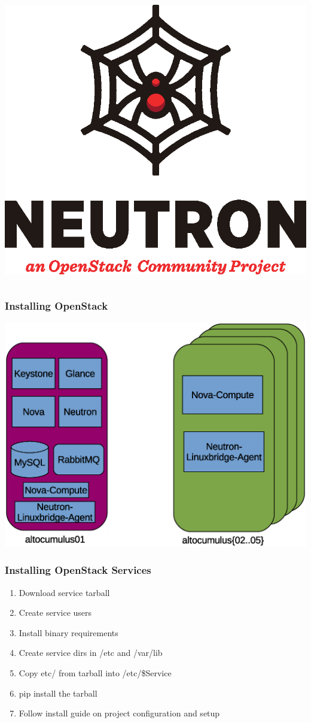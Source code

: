 \documentclass[aspectratio=169,11pt,hyperref={colorlinks=true}]{beamer}
\begin{document}
\begin{frame}
\begin{columns}[T]
\begin{column}{.48\textwidth}
            \includegraphics[height=.25\textheight]{mascots/neutron.eps}\\
        \end{column}
    \end{columns}
\end{frame}

\begin{frame}
    \frametitle{Installing OpenStack}
    \centering
    \includegraphics[width=.8\textwidth]{service-split.eps}
\end{frame}
\begin{frame}
    \frametitle{Installing OpenStack Services}
    \begin{enumerate}
        \item Download service tarball
        \item Create service users
        \item Install binary requirements
        \item Create service dirs in /etc and /var/lib
        \item Copy etc/ from tarball into /etc/\$Service
        \item pip install the tarball
        \item Follow install guide on project configuration and setup
    \end{enumerate}
\end{frame}
\end{document}
